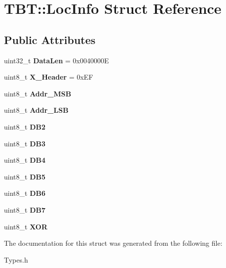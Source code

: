 \hypertarget{structTBT_1_1LocInfo}{}\section{T\+BT\+:\+:Loc\+Info Struct Reference}
\label{structTBT_1_1LocInfo}
\subsection*{Public Attributes}
\begin{DoxyCompactItemize}
\item 
\mbox{\label{structTBT_1_1LocInfo_a0d8fe6578172ef468f3efdd101cf9529}} 
uint32\+\_\+t {\bfseries Data\+Len} = 0x0040000E
\item 
\mbox{\label{structTBT_1_1LocInfo_a89133f4810d6228a3f918352c03eb922}} 
uint8\+\_\+t {\bfseries X\+\_\+\+Header} = 0x\+EF
\item 
\mbox{\label{structTBT_1_1LocInfo_a3283b821238bcfc7b9c5a6f126dbe8ff}} 
uint8\+\_\+t {\bfseries Addr\+\_\+\+M\+SB}
\item 
\mbox{\label{structTBT_1_1LocInfo_afcda6186c86f12fee9f0907c667ba2c1}} 
uint8\+\_\+t {\bfseries Addr\+\_\+\+L\+SB}
\item 
\mbox{\label{structTBT_1_1LocInfo_a3afd371cc25c979fac7ac0af9f1ad48a}} 
uint8\+\_\+t {\bfseries D\+B2}
\item 
\mbox{\label{structTBT_1_1LocInfo_aa2e76b63a3657b7fe1bf602186a416fa}} 
uint8\+\_\+t {\bfseries D\+B3}
\item 
\mbox{\label{structTBT_1_1LocInfo_aa6b13fcc4b2b02ba839f91bb78e37b50}} 
uint8\+\_\+t {\bfseries D\+B4}
\item 
\mbox{\label{structTBT_1_1LocInfo_ae9425a4b329dc1f773042737212fa49c}} 
uint8\+\_\+t {\bfseries D\+B5}
\item 
\mbox{\label{structTBT_1_1LocInfo_acceeedfb63ab970403ce8b75b611f59f}} 
uint8\+\_\+t {\bfseries D\+B6}
\item 
\mbox{\label{structTBT_1_1LocInfo_ada6908e13b58140fe9a127de250f893e}} 
uint8\+\_\+t {\bfseries D\+B7}
\item 
\mbox{\label{structTBT_1_1LocInfo_a291c95e946ab6a1390523590bdeb7722}} 
uint8\+\_\+t {\bfseries X\+OR}
\end{DoxyCompactItemize}


The documentation for this struct was generated from the following file\+:\begin{DoxyCompactItemize}
\item 
Types.\+h\end{DoxyCompactItemize}
